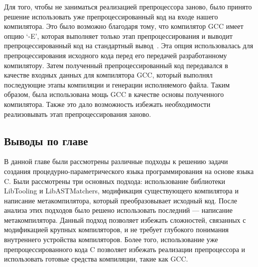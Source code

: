 Для того, чтобы не заниматься реализацией препроцессора заново, было принято решение использовать уже препроцессированный код на входе нашего компилятора. Это было возможно благодаря тому, что компилятор GCC имеет опцию `-E', которая выполняет только этап препроцессирования и выводит препроцессированный код на стандартный вывод~\cite{wall2004basicgcc}. Эта опция использовалась для препроцессирования исходного кода перед его передачей разработанному компилятору. Затем полученный препроцессированный код передавался в качестве входных данных для компилятора GCC, который выполнял последующие этапы компиляции и генерации исполняемого файла. Таким образом, была использована мощь GCC в качестве основы полученного компилятора. Также это дало возможность избежать необходимости реализовывать этап препроцессирования заново.


\subsection*{Выводы по главе}
В данной главе были рассмотрены различные подходы к решению задачи создания процедурно-параметрического языка программирования на основе языка C. Были рассмотрены три основных подхода: использование библиотеки LibTooling и LibASTMatchers, модификация существующего компилятора и написание метакомпилятора, который преобразовывает исходный код. После анализа этих подходов было решено использовать последний --- написание метакомпилятора. Данный подход позволяет избежать сложностей, связанных с модификацией крупных компиляторов, и не требует глубокого понимания внутреннего устройства компиляторов. Более того, использование уже препроцессированного кода C позволяет избежать реализации препроцессора и использовать готовые средства компиляции, такие как GCC.
